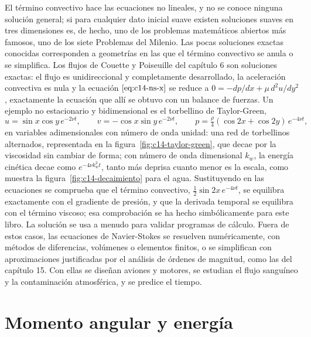 \documentclass[10pt,openany]{book}
\begin{document}
El término convectivo hace las ecuaciones no lineales, y no se conoce ninguna solución general; si para cualquier dato inicial suave existen soluciones suaves en tres dimensiones es, de hecho, uno de los problemas matemáticos abiertos más famosos, uno de los siete Problemas del Milenio. Las pocas soluciones exactas conocidas corresponden a geometrías en las que el término convectivo se anula o se simplifica. Los flujos de Couette y Poiseuille del capítulo 6 son soluciones exactas: el flujo es unidireccional y completamente desarrollado, la aceleración convectiva es nula y la ecuación \(\eqref{eq:c14-ns-x}\) se reduce a \(0 = -dp/dx + \mu\,d^{2}u/dy^{2}\), exactamente la ecuación que allí se obtuvo con un balance de fuerzas. Un ejemplo no estacionario y bidimensional es el torbellino de Taylor-Green,
\begin{equation}
u = \sin x\cos y\,e^{-2\nu t},\qquad v = -\cos x\sin y\,e^{-2\nu t},\qquad p = \tfrac{\rho}{4}(\cos 2x + \cos 2y)\,e^{-4\nu t}, \label{eq:c14-tg}
\end{equation}
en variables adimensionales con número de onda unidad: una red de torbellinos alternados, representada en la figura~\ref{fig:c14-taylor-green}, que decae por la viscosidad sin cambiar de forma; con número de onda dimensional \(k_w\), la energía cinética decae como \(e^{-4\nu k_w^{2} t}\), tanto más deprisa cuanto menor es la escala, como muestra la figura~\ref{fig:c14-decaimiento} para el agua. Sustituyendo en las ecuaciones se comprueba que el término convectivo, \(\tfrac12\sin 2x\,e^{-4\nu t}\), se equilibra exactamente con el gradiente de presión, y que la derivada temporal se equilibra con el término viscoso; esa comprobación se ha hecho simbólicamente para este libro. La solución se usa a menudo para validar programas de cálculo. Fuera de estos casos, las ecuaciones de Navier-Stokes se resuelven numéricamente, con métodos de diferencias, volúmenes o elementos finitos, o se simplifican con aproximaciones justificadas por el análisis de órdenes de magnitud, como las del capítulo 15. Con ellas se diseñan aviones y motores, se estudian el flujo sanguíneo y la contaminación atmosférica, y se predice el tiempo.

\section{Momento angular y energía}
\end{document}
